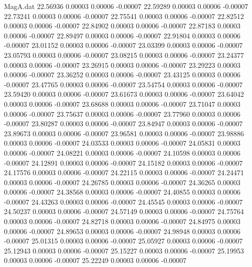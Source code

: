 \begin{filecontents}{MagA.dat}
  22.56936    0.00003    0.00006   -0.00007
  22.59289    0.00003    0.00006   -0.00007
  22.73241    0.00003    0.00006   -0.00007
  22.75541    0.00003    0.00006   -0.00007
  22.82512    0.00003    0.00006   -0.00007
  22.84902    0.00003    0.00006   -0.00007
  22.87183    0.00003    0.00006   -0.00007
  22.89497    0.00003    0.00006   -0.00007
  22.91804    0.00003    0.00006   -0.00007
  23.01152    0.00003    0.00006   -0.00007
  23.03399    0.00003    0.00006   -0.00007
  23.05793    0.00003    0.00006   -0.00007
  23.08215    0.00003    0.00006   -0.00007
  23.24377    0.00003    0.00006   -0.00007
  23.26915    0.00003    0.00006   -0.00007
  23.29223    0.00003    0.00006   -0.00007
  23.36252    0.00003    0.00006   -0.00007
  23.43125    0.00003    0.00006   -0.00007
  23.47765    0.00003    0.00006   -0.00007
  23.54754    0.00003    0.00006   -0.00007
  23.59420    0.00003    0.00006   -0.00007
  23.61673    0.00003    0.00006   -0.00007
  23.64042    0.00003    0.00006   -0.00007
  23.68688    0.00003    0.00006   -0.00007
  23.71047    0.00003    0.00006   -0.00007
  23.75637    0.00003    0.00006   -0.00007
  23.77960    0.00003    0.00006   -0.00007
  23.80287    0.00003    0.00006   -0.00007
  23.84947    0.00003    0.00006   -0.00007
  23.89673    0.00003    0.00006   -0.00007
  23.96581    0.00003    0.00006   -0.00007
  23.98886    0.00003    0.00006   -0.00007
  24.03533    0.00003    0.00006   -0.00007
  24.05831    0.00003    0.00006   -0.00007
  24.08221    0.00003    0.00006   -0.00007
  24.10598    0.00003    0.00006   -0.00007
  24.12891    0.00003    0.00006   -0.00007
  24.15182    0.00003    0.00006   -0.00007
  24.17576    0.00003    0.00006   -0.00007
  24.22115    0.00003    0.00006   -0.00007
  24.24471    0.00003    0.00006   -0.00007
  24.26785    0.00003    0.00006   -0.00007
  24.36265    0.00003    0.00006   -0.00007
  24.38568    0.00003    0.00006   -0.00007
  24.40855    0.00003    0.00006   -0.00007
  24.43263    0.00003    0.00006   -0.00007
  24.45545    0.00003    0.00006   -0.00007
  24.50237    0.00003    0.00006   -0.00007
  24.57149    0.00003    0.00006   -0.00007
  24.75764    0.00003    0.00006   -0.00007
  24.82718    0.00003    0.00006   -0.00007
  24.84975    0.00003    0.00006   -0.00007
  24.89653    0.00003    0.00006   -0.00007
  24.98948    0.00003    0.00006   -0.00007
  25.01315    0.00003    0.00006   -0.00007
  25.05927    0.00003    0.00006   -0.00007
  25.12943    0.00003    0.00006   -0.00007
  25.15227    0.00003    0.00006   -0.00007
  25.19953    0.00003    0.00006   -0.00007
  25.22249    0.00003    0.00006   -0.00007

\end{filecontents}
